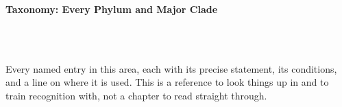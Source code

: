 



\makeindex[title={Index of This Volume},columns=2,intoc]

\begin{titlepage}\thispagestyle{empty}
\vspace*{0.14\textheight}
\noindent{\color{tiercat}\rule{\textwidth}{5pt}}\\[3pt]
\noindent{\color{bioline}\rule{\textwidth}{1pt}}\\[26pt]
\\[12pt]
\noindent\begin{minipage}{\textwidth}\raggedright
{\sffamily\bfseries\fontsize{28}{32}\selectfont\color{bioink}%
 \hyphenchar{} Taxonomy: Every Phylum and Major Clade\par}\end{minipage}\\[16pt]
\noindent{\color{biogreen}\rule{\textwidth}{1.4pt}}\\[10pt]
\noindent\begin{minipage}{\textwidth}\raggedright
{\fontsize{10.5}{14}\selectfont\color{biogreen}%
Every named entry in this area, each with its precise statement, its conditions, and a line on
where it is used. This is a reference to look things up in and to train recognition with, not a
chapter to read straight through.\par}\end{minipage}
\vfill
\noindent{\color{bioline}\rule{\textwidth}{1pt}}\\[3pt]
\noindent{\color{tiercat}\rule{\textwidth}{5pt}}
\end{titlepage}
\tableofcontents
\clearpage
{}
\clearpage
\printindex

